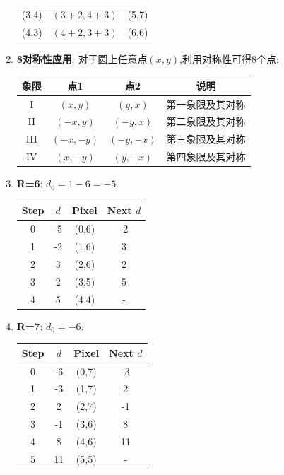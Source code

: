 \documentclass[UTF8]{ctexart}
\begin{document}
\begin{enumerate}
\begin{center}
\begin{tabular}{ccc}
    (3,4) & $(3+2, 4+3)$ & (5,7) \\ (4,3) & $(4+2, 3+3)$ & (6,6) \\ \bottomrule
    \end{tabular}
    \end{center}
    \item \textbf{8对称性应用}: 对于圆上任意点$(x,y)$,利用对称性可得8个点:
    \begin{center}
    \begin{tabular}{cccc}
    \toprule 象限 & 点1 & 点2 & 说明 \\ \midrule
    I & $(x,y)$ & $(y,x)$ & 第一象限及其对称 \\
    II & $(-x,y)$ & $(-y,x)$ & 第二象限及其对称 \\
    III & $(-x,-y)$ & $(-y,-x)$ & 第三象限及其对称 \\
    IV & $(x,-y)$ & $(y,-x)$ & 第四象限及其对称 \\ \bottomrule
    \end{tabular}
    \end{center}
    
    \item \textbf{R=6}: $d_0=1-6=-5$.
    \begin{center}
    \begin{tabular}{cccc}
    \toprule Step & $d$ & Pixel & Next $d$ \\ \midrule
    0 & -5 & (0,6) & -2 \\
    1 & -2 & (1,6) & 3 \\ 2 & 3 & (2,6) & 2 \\
    3 & 2 & (3,5) & 5 \\ 4 & 5 & (4,4) & - \\ \bottomrule
    \end{tabular}
    \end{center}
    
    \item \textbf{R=7}: $d_0=-6$.
    \begin{center}
    \begin{tabular}{cccc}
    \toprule Step & $d$ & Pixel & Next $d$ \\ \midrule
    0 & -6 & (0,7) & -3 \\
    1 & -3 & (1,7) & 2 \\ 2 & 2 & (2,7) & -1 \\
    3 & -1 & (3,6) & 8 \\ 4 & 8 & (4,6) & 11 \\
    5 & 11 & (5,5) & - \\ \bottomrule
    \end{tabular}
    \end{center}
    

\end{enumerate}
\end{document}
